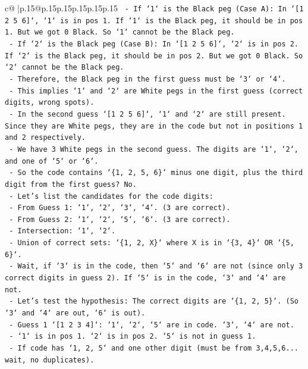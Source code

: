 \documentclass{article}
\begin{document}
{\begin{supertabular}{c@{$\;$}|p{.15\linewidth}@{}p{.15\linewidth}p{.15\linewidth}p{.15\linewidth}p{.15\linewidth}p{.15\linewidth}}
{{{\texttt{        {-} If `1` is the Black peg (Case A): In `{[}1 2 5 6{]}`, `1` is in pos 1. If `1` is the Black peg, it should be in pos 1. But we got 0 Black. So `1` cannot be the Black peg.} \\
\texttt{        {-} If `2` is the Black peg (Case B): In `{[}1 2 5 6{]}`, `2` is in pos 2. If `2` is the Black peg, it should be in pos 2. But we got 0 Black. So `2` cannot be the Black peg.} \\
\texttt{        {-} Therefore, the Black peg in the first guess must be `3` or `4`.} \\
\texttt{        {-} This implies `1` and `2` are White pegs in the first guess (correct digits, wrong spots).} \\
\texttt{        {-} In the second guess `{[}1 2 5 6{]}`, `1` and `2` are still present. Since they are White pegs, they are in the code but not in positions 1 and 2 respectively.} \\
\texttt{        {-} We have 3 White pegs in the second guess. The digits are `1`, `2`, and one of `5` or `6`.} \\
\texttt{        {-} So the code contains `\{1, 2, 5, 6\}` minus one digit, plus the third digit from the first guess? No.} \\
\texttt{        {-} Let's list the candidates for the code digits:} \\
\texttt{            {-} From Guess 1: `1`, `2`, `3`, `4`. (3 are correct).} \\
\texttt{            {-} From Guess 2: `1`, `2`, `5`, `6`. (3 are correct).} \\
\texttt{            {-} Intersection: `1`, `2`.} \\
\texttt{            {-} Union of correct sets: `\{1, 2, X\}` where X is in `\{3, 4\}` OR `\{5, 6\}`.} \\
\texttt{            {-} Wait, if `3` is in the code, then `5` and `6` are not (since only 3 correct digits in guess 2). If `5` is in the code, `3` and `4` are not.} \\
\texttt{            {-} Let's test the hypothesis: The correct digits are `\{1, 2, 5\}`. (So `3` and `4` are out, `6` is out).} \\
\texttt{                {-} Guess 1 `{[}1 2 3 4{]}`: `1`, `2`, `5` are in code. `3`, `4` are not.} \\
\texttt{                    {-} `1` is in pos 1. `2` is in pos 2. `5` is not in guess 1.} \\
\texttt{                    {-} If code has `1, 2, 5` and one other digit (must be from 3,4,5,6... wait, no duplicates).} \\
}}}
\end{supertabular}}
\end{document}
